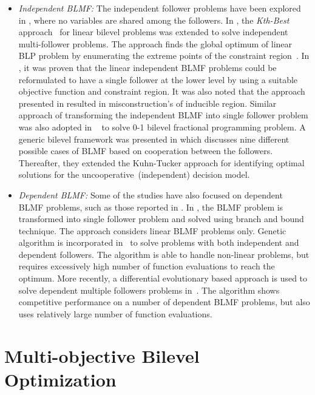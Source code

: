 \begin{itemize} \item {\it Independent BLMF: } The independent follower problems have been explored
in \cite{shi2005k,calvete2007linear,lu2006bilevel}, where no variables are shared among the
followers. In \cite{shi2005k}, the \emph{Kth-Best} approach~\cite{candler1982linear} for linear
bilevel problems was extended to solve independent multi-follower problems. The approach finds the
global optimum of linear BLP problem by enumerating the extreme points of the constraint
region~\cite{shi2005k}. In \cite{calvete2007linear}, it was proven that the linear independent BLMF
problems could be reformulated to have a single follower at the lower level by using a suitable
objective function and constraint region. It was also noted that the approach presented in
\cite{shi2005k} resulted in misconstruction's of inducible region. Similar approach of transforming
the independent BLMF into single follower problem was also adopted in ~\cite{arora20090} to solve
0-1 bilevel fractional programming problem. A generic bilevel framework was presented in
\cite{lu2006bilevel} which discusses nine different possible cases of BLMF based on cooperation
between the followers. Thereafter, they extended the Kuhn-Tucker approach for identifying optimal
solutions for the uncooperative~(independent) decision model.

\item {\it Dependent BLMF: } Some of the studies have also focused on dependent BLMF problems, such
as those reported in \cite{liu1998stackelberg,Qian2000,angelo2015}. In \cite{Qian2000}, the BLMF
problem is transformed into single follower problem and solved using branch and bound technique. The
approach considers linear BLMF problems only. Genetic algorithm is incorporated
in~\cite{liu1998stackelberg} to solve problems with both independent and dependent followers. The
algorithm is able to handle non-linear problems, but requires excessively high number of function
evaluations to reach the optimum. More recently, a differential evolutionary based approach is used
to solve dependent multiple followers problems in~\cite{angelo2015}. The algorithm shows competitive
performance on a number of dependent BLMF problems, but also uses relatively large number of
function evaluations.

\end{itemize}


\section{Multi-objective Bilevel Optimization}
\label{multi_obj_ch_2}



